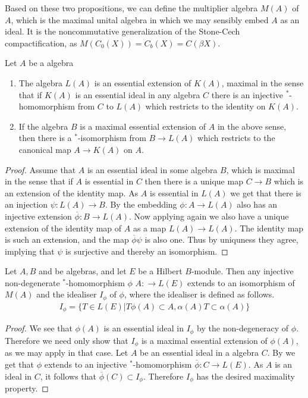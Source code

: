Based on these two propositions, we can define the multiplier algebra $M(A)$ of $A$, which is the maximal unital \Cstar algebra in which we may sensibly embed $A$ as an ideal. It is the noncommutative generalization of the Stone-Cech compactification, as $M(C_0(X))=C_b(X)=C(\beta X)$. 
\begin{proposition}\label{multiplier2}
	Let $A$ be a \Cstar algebra
	\begin{enumerate}
	\item
	The algebra $L(A)$ is an essential extension of $K(A)$, maximal in the sense that if $K(A)$ is an essential ideal in any \Cstar algebra $C$ there is an injective $^*$-homomorphism from $C$ to $L(A)$ which restricts to the identity on $K(A)$. 
	\item
		If the \Cstar algebra $B$ is a maximal essential extension of $A$ in the above sense, then there is a $^*$-isomorphism from $B\to L(A)$ which restricts to the canonical map $A\to K(A)$ on $A$. 
	\end{enumerate}
\end{proposition}
\begin{proof}
	Assume that $A$ is an essential ideal in some \Cstar algebra $B$, which is maximal in the sense that if $A$ is essential in $C$ then there is a unique map $C\to B$ which is an extension of the identity map. As $A$ is essential in $L(A)$ we get that there is an injection $\psi: L(A)\to B$. By  the embedding $\phi:A\to L(A)$ also has an injective extension $\overline{\phi}:B\to L(A)$. Now applying  again we also have a unique extension of the identity map of $A$ as a map $L(A)\to L(A)$. The identity map is such an extension, and the map $\overline{\phi}\psi$ is also one. Thus by uniquness they agree, implying that $\psi$ is surjective and thereby an isomorphism.
\end{proof}
\begin{proposition}\label{multiplier3}
	Let $A,B$ and be \Cstar algebras, and let $E$ be a Hilbert $B$-module. Then any injective non-degenerate $^*$-homomorphism $\phi$ $A:\to L(E)$ extends to an isomorphism of $M(A)$ and the idealiser $I_{\phi}$ of $\phi$, where the idealiser is defined as follows.
	\begin{align*}
		I_{\phi}=\{T\in L(E)| T\phi(A)\subset A,\alpha(A)T\subset \alpha(A)\}
	\end{align*}
\end{proposition}
\begin{proof}
	We see that $\phi(A)$ is an essential ideal in $I_{\phi}$ by the non-degeneracy of $\phi$. Therefore we need only show that $I_{\phi}$ is a maximal essential extension of $\phi(A)$, as we may apply  in that case. 
	Let $A$ be an essential ideal in a \Cstar algebra $C$. By  we get that $\phi$ extends to an injective $^*$-homomorphism $\overline{\phi}:C\to L(E)$. As $A$ is an ideal in $C$, it follows that $\overline{\phi}(C)\subset I_{\phi}$. Therefore $I_{\phi}$ has the desired maximality property.  
\end{proof}
